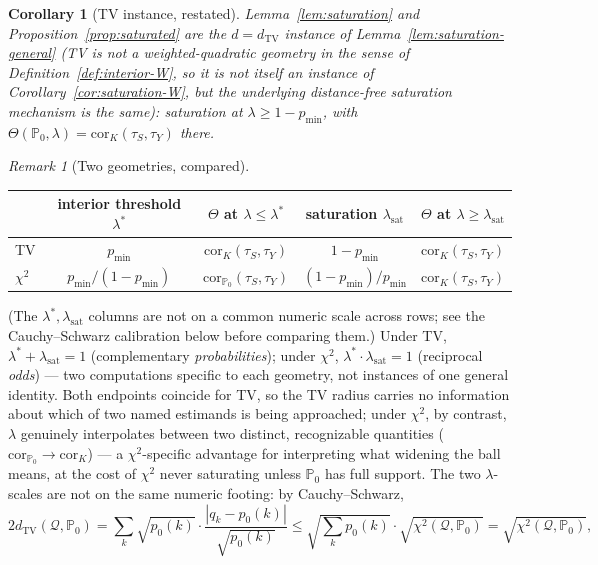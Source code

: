 \documentclass[11pt]{article}
\theoremstyle{plain}
\newtheorem{corollary}[theorem]{Corollary}
\theoremstyle{definition}
\theoremstyle{remark}
\newtheorem{remark}[theorem]{Remark}
\newcommand{\PP}{\mathbb{P}}
\newcommand{\Q}{\mathcal{Q}}
\newcommand{\Corr}{\mathrm{cor}}
\begin{document}
\begin{corollary}[TV instance, restated]\label{cor:saturation-tv}
Lemma~\ref{lem:saturation} and Proposition~\ref{prop:saturated} are the
$d=d_{\mathrm{TV}}$ instance of Lemma~\ref{lem:saturation-general} (TV is not a
weighted-quadratic geometry in the sense of Definition~\ref{def:interior-W}, so it is
not itself an instance of Corollary~\ref{cor:saturation-W}, but the underlying
distance-free saturation mechanism is the same): saturation at $\lambda\ge1-p_{\min}$,
with $\Theta(\PP_0,\lambda)=\Corr_K(\tau_S,\tau_Y)$ there.
\end{corollary}

\begin{remark}[Two geometries, compared]\label{rem:tv-chisq-comparison}
\begin{center}
\begin{tabular}{@{}lcccc@{}}
\toprule
& interior threshold $\lambda^*$ & $\Theta$ at $\lambda\le\lambda^*$
  & saturation $\lambda_{\mathrm{sat}}$ & $\Theta$ at $\lambda\ge\lambda_{\mathrm{sat}}$ \\
\midrule
TV & $p_{\min}$ & $\Corr_K(\tau_S,\tau_Y)$ & $1-p_{\min}$ & $\Corr_K(\tau_S,\tau_Y)$ \\
$\chi^2$ & $p_{\min}/(1-p_{\min})$ & $\Corr_{\PP_0}(\tau_S,\tau_Y)$
  & $(1-p_{\min})/p_{\min}$ & $\Corr_K(\tau_S,\tau_Y)$ \\
\bottomrule
\end{tabular}
\end{center}
(The $\lambda^*,\lambda_{\mathrm{sat}}$ columns are not on a common numeric scale
across rows; see the Cauchy--Schwarz calibration below before comparing them.)
Under TV, $\lambda^*+\lambda_{\mathrm{sat}}=1$ (complementary \emph{probabilities});
under $\chi^2$, $\lambda^*\cdot\lambda_{\mathrm{sat}}=1$ (reciprocal \emph{odds}) ---
two computations specific to each geometry, not instances of one general identity.
Both endpoints coincide for TV, so the TV radius carries no information about which
of two named estimands is being approached; under $\chi^2$, by contrast, $\lambda$
genuinely interpolates between two distinct, recognizable quantities
($\Corr_{\PP_0}\to\Corr_K$) --- a $\chi^2$-specific advantage for interpreting what
widening the ball means, at the cost of $\chi^2$ never saturating unless $\PP_0$ has
full support. The two $\lambda$-scales are not on the same numeric footing: by
Cauchy--Schwarz,
\[
    2d_{\mathrm{TV}}(\Q,\PP_0)=\sum_k\sqrt{p_0(k)}\cdot\frac{|q_k-p_0(k)|}{\sqrt{p_0(k)}}
    \le\sqrt{\textstyle\sum_kp_0(k)}\cdot\sqrt{\chi^2(\Q,\PP_0)}=\sqrt{\chi^2(\Q,\PP_0)},
\]
\end{remark}
\end{document}
